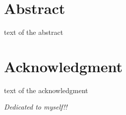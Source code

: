 \documentclass[12pt,a4paper]{book}
\begin{document}
\renewcommand{\thepage}{\roman{page}}
\chapter*{Abstract}

text of the abstract


\chapter*{Acknowledgment}

text of the acknowledgment

\cleardoublepage
\thispagestyle{empty}
\begin{flushright}
\itshape
Dedicated to myself!!
\end{flushright}
\cleardoublepage


\tableofcontents
\listoffigures
\listoftables








%









%
\end{document}
